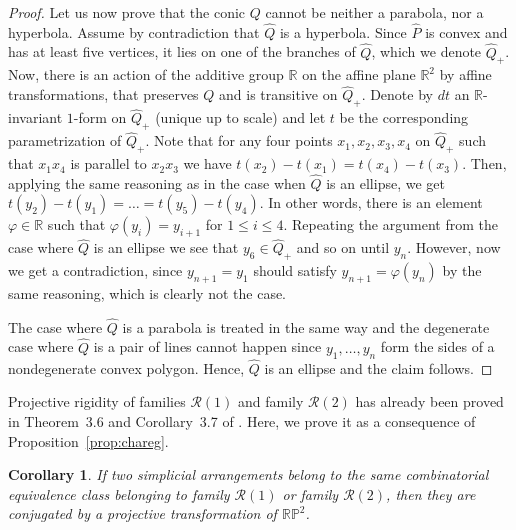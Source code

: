\documentclass[a4paper,11pt,reqno]{amsart}
\newtheorem{cor}[thm]{Corollary}
\theoremstyle{definition}
\theoremstyle{remark}
\theoremstyle{definition}
\theoremstyle{definition}
\theoremstyle{definition}
\numberwithin{equation}{section}
\begin{document}
\begin{proof}
Let us now prove that the conic $Q$ cannot be neither a parabola, nor a hyperbola. Assume by contradiction that $\widehat{Q}$ is a hyperbola. Since $\widehat P$ is convex and has at least five vertices, it lies on one of the branches of $\widehat{Q}$, which we denote $\widehat{Q}_{+}$. Now, there is an action of the additive group $\mathbb{R}$ on the affine plane $\mathbb{R}^{2}$ by affine transformations, that  preserves $Q$ and is transitive on $\widehat{Q}_{+}$. Denote by $dt$ an $\mathbb R$-invariant $1$-form on $\widehat{Q}_{+}$ (unique up to scale) and let $t$ be the corresponding parametrization of $\widehat{Q}_{+}$. Note that for any four points $x_1,x_2,x_3,x_4$ on $\widehat{Q}_{+}$ such that $x_1x_4$ is parallel to $x_2x_3$ we have $t(x_2)-t(x_1)=t(x_4)-t(x_3)$. Then, applying the same reasoning as in the case when $\widehat{Q}$ is an ellipse, we get $t(y_2)-t(y_1)=\ldots=t(y_5)-t(y_4)$. In other words, there is an element $\varphi\in \mathbb R$ such that $\varphi(y_i)=y_{i+1}$ for $1 \leq i \leq 4$. Repeating the argument from the case where $\widehat{Q}$ is an ellipse we see that $y_6\in \widehat{Q}_{+}$ and so on until $y_n$. However, now we get a contradiction, since $y_{n+1}=y_1$ should satisfy $y_{n+1}=\varphi(y_n)$ by the same reasoning, which is clearly not the case.
\par
The case where $\widehat{Q}$ is a parabola is treated in the same way and the degenerate case where $\widehat{Q}$ is a pair of lines cannot happen since $y_{1},\dots,y_{n}$ form the sides of a nondegenerate convex polygon. Hence, $\widehat{Q}$ is an ellipse and the claim follows.
\end{proof}

Projective rigidity of families $\mathcal{R}(1)$ and family $\mathcal{R}(2)$ has already been proved in Theorem~3.6 and Corollary~3.7 of \cite{Cu}. Here, we prove it as a consequence of Proposition~\ref{prop:chareg}.

\begin{cor}\label{cor:ProRig}
If two simplicial arrangements belong to the same combinatorial equivalence class belonging to family $\mathcal{R}(1)$ or family $\mathcal{R}(2)$, then they are conjugated by a projective transformation of $\mathbb{RP}^{2}$.
\end{cor}
\end{document}

